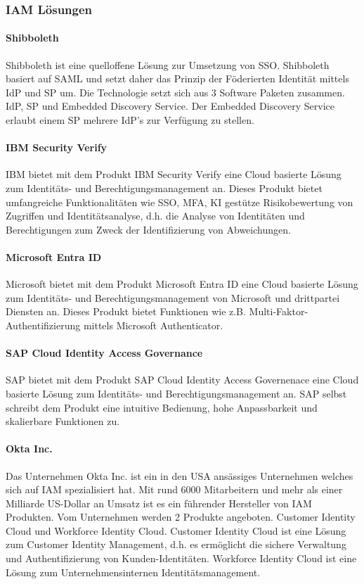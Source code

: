 \documentclass[12pt]{article}
\begin{document}
\subsubsection{IAM Lösungen}
\paragraph{Shibboleth}
Shibboleth ist eine quelloffene Lösung zur Umsetzung von SSO. Shibboleth basiert auf SAML und setzt daher das Prinzip der Föderierten Identität mittels IdP und SP um. Die Technologie setzt sich aus 3 Software Paketen zusammen. IdP, SP und Embedded Discovery Service. Der Embedded Discovery Service erlaubt einem SP mehrere IdP's zur Verfügung zu stellen.
\paragraph{IBM Security Verify}
IBM bietet mit dem Produkt \glqq{}IBM Security Verify\grqq{} eine Cloud basierte Lösung zum Identitäts- und Berechtigungsmanagement an. Dieses Produkt bietet umfangreiche Funktionalitäten wie SSO, MFA, KI gestütze Risikobewertung von Zugriffen und Identitätsanalyse, d.h. die Analyse von Identitäten und Berechtigungen zum Zweck der Identifizierung von Abweichungen.
\paragraph{Microsoft Entra ID}
Microsoft bietet mit dem Produkt \glqq{}Microsoft Entra ID\grqq{} eine Cloud basierte Lösung zum Identitäts- und Berechtigungsmanagement von Microsoft und drittpartei Diensten an. Dieses Produkt bietet Funktionen wie z.B. Multi-Faktor-Authentifizierung mittels Microsoft Authenticator.
\paragraph{SAP Cloud Identity Access Governance}
SAP bietet mit dem Produkt \glqq{}SAP Cloud Identity Access Governenace\grqq{} eine Cloud basierte Lösung zum Identitäts- und Berechtigungsmanagement an. SAP selbst schreibt dem Produkt eine intuitive Bedienung, hohe Anpassbarkeit und skalierbare Funktionen zu.
\paragraph{Okta Inc.}
Das Unternehmen Okta Inc. ist ein in den USA ansässiges Unternehmen welches sich auf IAM spezialisiert hat. Mit rund 6000 Mitarbeitern und mehr als einer Milliarde US-Dollar an Umsatz ist es ein führender Hersteller von IAM Produkten. Vom Unternehmen werden 2 Produkte angeboten. Customer Identity Cloud und Workforce Identity Cloud. Customer Identity Cloud ist eine Lösung zum Customer Identity Management, d.h. es ermöglicht die sichere Verwaltung und Authentifizierung von Kunden-Identitäten. Workforce Identity Cloud ist eine Lösung zum Unternehmensinternen Identitätsmanagement.
\end{document}
